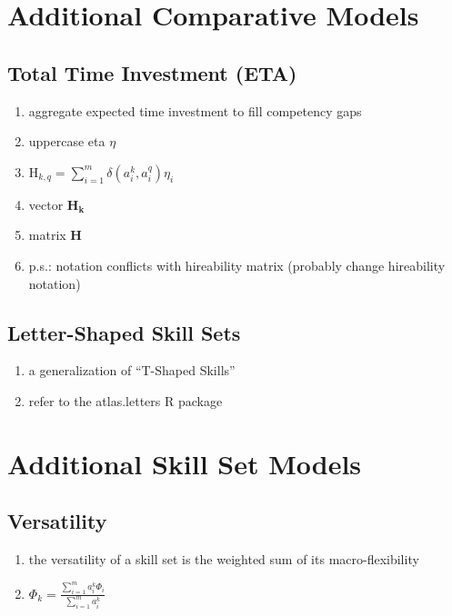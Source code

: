 \documentclass{elsarticle} %
\begin{document}

\section{Additional Comparative Models}
\subsection{Total Time Investment (ETA)}
\begin{enumerate}
    \item aggregate expected time investment to fill competency gaps
    \item uppercase eta $\eta$
    \item $\text{H}_{k,q} = \sum_{i=1}^{m}{
              \delta(a_{i}^{k}, a_{i}^{q})
              \eta_i
              }$
    \item vector $\textbf{H}\boldsymbol{_k}$
    \item matrix $\textbf{H}$
    \item p.s.: notation conflicts with hireability matrix (probably change hireability
          notation)
\end{enumerate}

\subsection{Letter-Shaped Skill Sets}
\begin{enumerate}
    \item a generalization of ``T-Shaped Skills''
    \item refer to the atlas.letters R package
\end{enumerate}


\section{Additional Skill Set Models}
\subsection{Versatility}
\begin{enumerate}
    \item the versatility of a skill set is the weighted sum of its macro-flexibility
    \item $\Phi_k = \frac{ \sum_{i=1}^{m}{a_{i}^{k} \Phi_i} }{
              \sum_{i=1}^{m}{a_{i}^{k}} }$
\end{enumerate}
\end{document}
